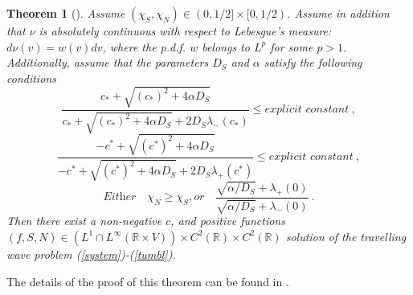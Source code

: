 \documentclass[11pt,twoside]{article}
\numberwithin{equation}{section}
\newtheorem{theorem}{Theorem}[section]
\begin{document}
\begin{theorem}[\cite{calvez2016chemotactic}]
    Assume $(\chi_S,\chi_N)\in (0,1/2]\times [0,1/2)$. Assume in addition that  $\nu$ is absolutely continuous with respect to Lebesgue's measure: $d\nu(v)=w(v)dv$, where the p.d.f. $w$ belongs to $L^p$  for some $p>1$.
    Additionally, assume that the parameters $D_S$ and $\alpha$ satisfy the following conditions
    \begin{equation}\label{1.cond}
\frac{c_*+ \sqrt{(c_*)^2+4\alpha D_S}}{c_*+\sqrt{(c_*)^2+4\alpha D_S}+2D_S\lambda_-(c_*)}\leq \textit{explicit constant}\ ,
\end{equation}
\begin{equation}\label{2.cond}
\frac{-c^*+ \sqrt{(c^*)^2+4\alpha D_S}}{-c^*+\sqrt{(c^*)^2+4\alpha D_S}+2D_S\lambda_+(c^*)}\leq \textit{explicit constant}\ ,
\end{equation}
\begin{equation}\label{3.cond}
\textit{Either}\quad \chi_N \geq \chi_S, \textit{or} \quad \frac{\sqrt{\alpha/D_S}+\lambda_+(0)}{\sqrt{\alpha/D_S}+\lambda_-(0)}\ .
\end{equation}
Then there exist a non-negative $c$, and positive functions $(f, S, N)\in (L^1\cap L^\infty (\mathbb{R}\times V))\times C^2(\mathbb{R})\times C^2(\mathbb{R})$ solution of the travelling wave problem (\ref{system})-(\ref{tumbl}).
\end{theorem}

The details of the proof of this theorem can be found in \cite{calvez2016chemotactic}.
\end{document}
